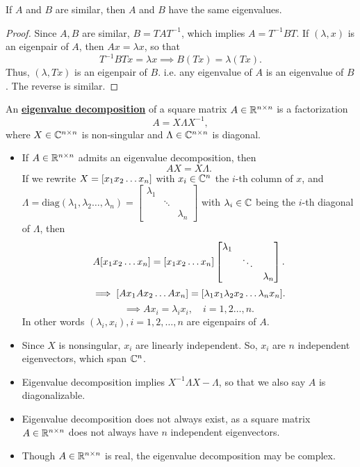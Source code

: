 \documentclass[../main/main.tex]{subfiles}
\begin{document}
\begin{theorem}
	If $A$ and $B$ are similar, then $A$ and $B$ have the same eigenvalues.
\end{theorem}
\begin{proof}
		Since $A,B$ are similar, $B=TAT^{-1}$, which implies $A=T^{-1}BT$. If $\left( \lambda, x \right) $ is an eigenpair of $A$, then $Ax=\lambda x$, so that \[
				T^{-1}BTx=\lambda x\implies B\left( Tx \right) =\lambda\left( Tx \right) 
		.\] Thus, $\left( \lambda, Tx \right) $ is an eigenpair of $B$. i.e. any eigenvalue of $A$ is an eigenvalue of $B$. The reverse is similar.
\end{proof}
\begin{definition}
	An \underline{\textbf{eigenvalue decomposition}} of a square matrix $A\in \mathbb{R}^{n\times n}$ is a factorization \[
		A=X\Lambda X^{-1}
		,\] where $X\in\mathbb{C}^{n\times n}$ is non-singular and $\Lambda\in\mathbb{C}^{n\times n}$ is diagonal.
\end{definition}
\begin{itemize}
		\item If $A\in \mathbb{R}^{n\times n}$ admits an eigenvalue decomposition, then \[
		AX=X\Lambda
	.\] If we rewrite $X=[x_1\space x_2\space \ldots\space x_n]$ with $x_{i}\in \mathbb{C}^{n}$ the $i$-th column of $x$, and $\Lambda=\text{diag}(\lambda_1,\lambda_2\ldots,\lambda_n)=\begin{bmatrix} \lambda_1&&\\&\ddots&\\&&\lambda_n \end{bmatrix} $ with $\lambda_{i}\in \mathbb{C}$ being the $i$-th diagonal of $\Lambda$, then \[
	A[x_1\space x_2\space \ldots\space x_n]=[x_1\space x_2\space \ldots\space x_n]\begin{bmatrix} \lambda_1&&\\&\ddots&\\&&\lambda_n \end{bmatrix}
	.\] \[
		\implies [Ax_1\space Ax_2\space \ldots\space Ax_n]=[\lambda_1 x_1\space \lambda_2 x_2\space \ldots\space \lambda_n x_n]
	.\] \[
		\implies Ax_{i}=\lambda_ix_{i},\quad i=1,2\ldots,n
	.\] 
	In other words $\left( \lambda_i,x_{i} \right) ,i=1,2,\ldots,n$ are eigenpairs of $A$.
\item Since $X$ is nonsingular, $x_{i}$ are linearly independent. So, $x_{i}$ are $n$ independent eigenvectors, which span $\mathbb{C}^{n}$.
\item Eigenvalue decomposition implies $X^{-1}\Lambda X - \Lambda$, so that we also say $A$ is diagonalizable.
\item Eigenvalue decomposition does not always exist, as a square matrix $A\in \mathbb{R}^{n\times n}$ does not always have $n$ independent eigenvectors.
\item Though $A\in \mathbb{R}^{n\times n}$ is real, the eigenvalue decomposition may be complex.
\end{itemize}
\end{document}
